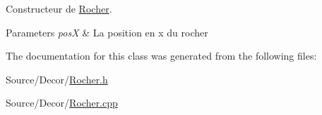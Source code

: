 Constructeur de \hyperlink{classRocher}{Rocher}. 


\begin{DoxyParams}{Parameters}
{\em pos\-X} & La position en x du rocher \\
\hline
\end{DoxyParams}


The documentation for this class was generated from the following files\-:\begin{DoxyCompactItemize}
\item 
Source/\-Decor/\hyperlink{Rocher_8h}{Rocher.\-h}\item 
Source/\-Decor/\hyperlink{Rocher_8cpp}{Rocher.\-cpp}\end{DoxyCompactItemize}
